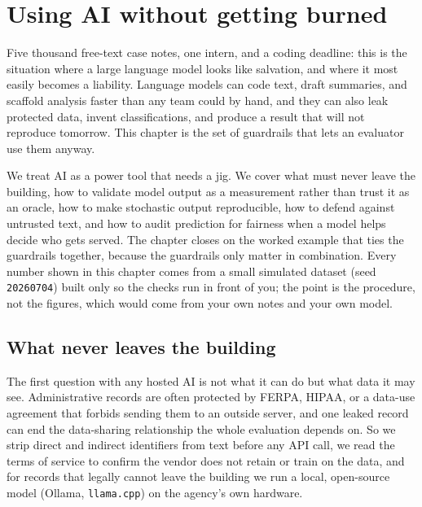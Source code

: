 \documentclass[
    a4paper,
    fontsize=10pt,
    twoside=true,
    numbers=noenddot,
]{kaobook}
\begin{document}
\chapter{Using AI without getting burned}\label{ch:ai}

Five thousand free-text case notes, one intern, and a coding deadline: this is the situation where a large language model looks like salvation, and where it most easily becomes a liability. Language models can code text, draft summaries, and scaffold analysis faster than any team could by hand, and they can also leak protected data, invent classifications, and produce a result that will not reproduce tomorrow. This chapter is the set of guardrails that lets an evaluator use them anyway.

We treat AI as a power tool that needs a jig. We cover what must never leave the building, how to validate model output as a measurement rather than trust it as an oracle, how to make stochastic output reproducible, how to defend against untrusted text, and how to audit prediction for fairness when a model helps decide who gets served. The chapter closes on the worked example that ties the guardrails together, because the guardrails only matter in combination. Every number shown in this chapter comes from a small simulated dataset (seed \texttt{20260704}) built only so the checks run in front of you; the point is the procedure, not the figures, which would come from your own notes and your own model.

\section{What never leaves the building}
The first question with any hosted AI is not what it can do but what data it may see. Administrative records are often protected by FERPA, HIPAA, or a data-use agreement that forbids sending them to an outside server, and one leaked record can end the data-sharing relationship the whole evaluation depends on. So we strip direct and indirect identifiers from text before any API call, we read the terms of service to confirm the vendor does not retain or train on the data, and for records that legally cannot leave the building we run a local, open-source model (Ollama, \texttt{llama.cpp}) on the agency's own hardware.
\end{document}
